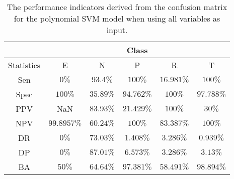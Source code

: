 \begin{table}[!ht]
	\centering
	\begin{tabular}{|c|c|c|c|c|c|}
		\hline
		 & \multicolumn{5}{c|}{Class} \\ \hline
		Statistics & E & N & P & R & T \\ \hline
		Sen & $0\%$ & $93.4\%$ & $100\%$ & $16.981\%$ & $100\%$ \\ \hline
		Spec & $100\%$ & $35.89\%$ & $94.762\%$ & $100\%$ & $97.788\%$ \\ \hline
		PPV & NaN & $83.93\%$ & $21.429\%$ & $100\%$ & $30\%$ \\ \hline
		NPV & $99.8957\%$ & $60.24\%$ & $100\%$ & $83.387\%$ & $100\%$ \\ \hline
		DR & $0\%$ & $73.03\%$ & $1.408\%$ & $3.286\%$ & $0.939\%$ \\ \hline
		DP & $0\%$ & $87.01\%$ & $6.573\%$ & $3.286\%$ & $3.13\%$ \\ \hline
		BA & $50\%$ & $64.64\%$ & $97.381\%$ & $58.491\%$ & $98.894\%$ \\ \hline
	\end{tabular}
	\caption{The performance indicators derived from the confusion matrix for the polynomial SVM model when using all variables as input.}
	\label{tab:cs:reverse:all:svmPoly}
\end{table}
